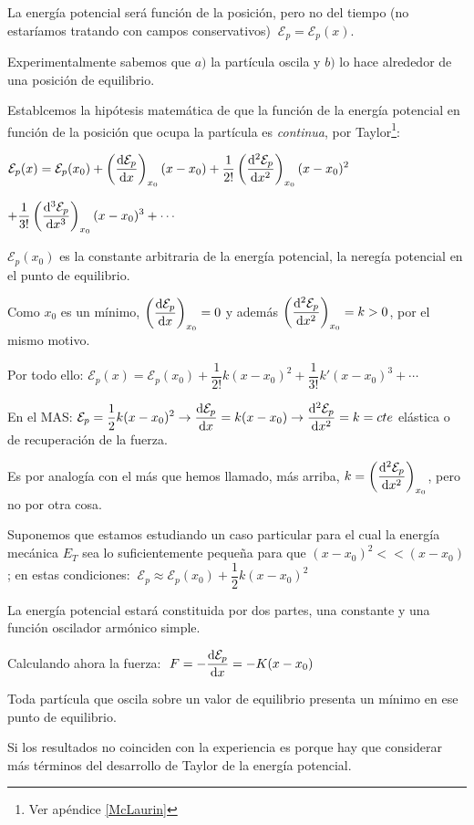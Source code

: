 La energía potencial será función de la posición, pero no del tiempo (no estaríamos tratando con campos conservativos) $\ \mathcal E_p=\mathcal E_p(x)$.

Experimentalmente sabemos que $a)$ la partícula oscila y $b)$ lo hace alrededor de una posición de equilibrio.

Establcemos la hipótesis matemática de que la función de la energía potencial en función de la posición que ocupa la partícula es \emph{continua}, por Taylor\footnote{Ver apéndice \ref{McLaurin}}:

$\displaystyle \mathcal E_p(x)=\mathcal E_p(x_0)+\left(\dv{\mathcal E_p}{x}\right)_{x_0}(x-x_0)+ \dfrac 1{2!}\left(\dv[2]{\mathcal E_p}{x}\right)_{x_0}(x-x_0)^2$

$\displaystyle +\dfrac 1{3!}\left(\dv[3]{\mathcal E_p}{x}\right)_{x_0}(x-x_0)^3+\cdots$

$\mathcal E_p(x_0)$ es la constante arbitraria de la energía potencial, la neregía potencial en el punto de equilibrio.

Como $x_0$ es un mínimo, $\displaystyle \left(\dv{\mathcal E_p}{x}\right)_{x_0}=0$ y además $\displaystyle \left(\dv[2]{\mathcal E_p}{x}\right)_{x_0}=k>0$, por el mismo motivo.

Por todo ello: $\displaystyle \mathcal E_p(x)=\mathcal E_p(x_0)+ \dfrac 1{2!} k(x-x_0)^2 +\dfrac 1 {3!} k' (x-x_0)^3 + \cdots$

En el MAS: $\displaystyle \mathcal E_p=\dfrac 1 2 k (x-x_0)^2 \to \dv{\mathcal E_p}{x}=k(x-x_0) \to \dv[2]{\mathcal E_p}{x}=k=cte$ elástica o de recuperación de la fuerza. 

Es por analogía con el más que hemos llamado, más arriba, $k=\displaystyle \left(\dv[2]{\mathcal E_p}{x}\right)_{x_0}$, pero no por otra cosa.

Suponemos que estamos estudiando un caso particular para el cual la energía mecánica $E_T$ sea lo suficientemente pequeña para que $(x-x_0)^2<<(x-x_0)$; en estas condiciones:
$\ \displaystyle \mathcal E_p \approx \mathcal E_p(x_0)+\dfrac 1 2 k (x-x_0)^2$

La energía potencial estará constituida por dos partes, una constante y una función oscilador armónico simple.

Calculando ahora la fuerza:  $\ F=-\displaystyle \dv{\mathcal E_p}{x}=-K(x-x_0)$

Toda partícula que oscila sobre un valor de equilibrio presenta un mínimo en ese punto de equilibrio.

Si los resultados no coinciden con la experiencia es porque hay que considerar más términos del desarrollo de Taylor de la energía potencial.

